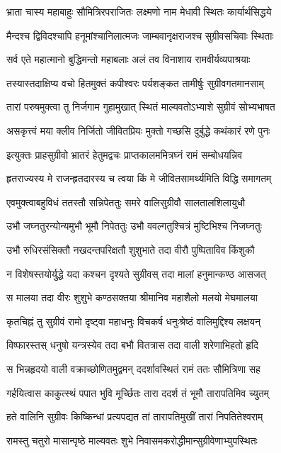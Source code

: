 \twolineshloka
{भ्राता चास्य महाबाहुः सौमित्रिरपराजितः}
{लक्ष्मणो नाम मेधावी स्थितः कार्यार्थसिद्धये}


\twolineshloka
{मैन्दश्च द्विविदश्चापि हनूमांश्चानिलात्मजः}
{जाम्बवानृक्षराजश्च सुग्रीवसचिवाः स्थिताः}


\twolineshloka
{सर्व एते महात्मानो बुद्धिमन्तो महाबलाः}
{अलं तव विनाशाय रामवीर्यव्यपाश्रयाः}


\twolineshloka
{तस्यास्तदाक्षिप्य वचो हितमुक्तं कपीश्वरः}
{पर्यशङ्कत तामीर्षुः सुग्रीवगतमानसाम्}


\twolineshloka
{तारां परुषमुक्त्वा तु निर्जगाम गुहामुखात्}
{स्थितं माल्यवतोऽभ्याशे सुग्रीवं सोभ्यभाषत}


\twolineshloka
{असकृत्त्वं मया क्लीव निर्जितो जीवितप्रियः}
{मुक्तो गच्छसि दुर्बुद्धे कथंकारं रणे पुनः}


\twolineshloka
{इत्युक्तः प्राहसुग्रीवो भ्रातरं हेतुमद्वचः}
{प्राप्तकालममित्रघ्नं रामं सम्बोधयन्निव}


\twolineshloka
{हृतराज्यस्य मे राजन्हृतदारस्य च त्वया}
{किं मे जीवितसामर्थ्यमिति विद्धि समागतम्}


\twolineshloka
{एवमुक्त्वाबहुविधं ततस्तौ सन्निपेततुः}
{समरे वालिसुग्रीवौ सालतालशिलायुधौ}


\twolineshloka
{उभौ जघ्नतुरन्योन्यमुभौ भूमौ निपेततुः}
{उभौ ववल्गतुश्चित्रं मुष्टिभिश्च निजघ्नतुः}


\twolineshloka
{उभौ रुधिरसंसिक्तौ नखदन्तपरिक्षतौ}
{शुशुभाते तदा वीरौ पुष्पिताविव किंशुकौ}


\twolineshloka
{न विशेषस्तयोर्युद्धे यदा कश्चन दृश्यते}
{सुग्रीवस् तदा मालां हनुमान्कण्ठ आसजत्}


\twolineshloka
{स मालया तदा वीरः शुशुभे कण्ठसक्तया}
{श्रीमानिव महाशैलो मलयो मेघमालया}


\twolineshloka
{कृतचिह्नं तु सुग्रीवं रामो दृष्ट्वा महाधनुः}
{विचकर्ष धनुःश्रेष्ठं वालिमुद्दिश्य लक्षयन्}


\twolineshloka
{विष्फारस्तस् धनुषो यन्त्रस्येव तदा बभौ}
{वितत्रास तदा वाली शरेणाभिहतो हृदि}


\twolineshloka
{स भिन्नहृदयो वाली वक्राच्छोणितमुद्वमन्}
{ददर्शावस्थितं रामं ततः सौमित्रिणा सह}


\twolineshloka
{गर्हयित्वास काकुत्स्थं पपात भुवि मूर्च्छितः}
{तारा ददर्श तं भूमौ तारापतिमिव च्युतम्}


\twolineshloka
{हते वालिनि सुग्रीवः किष्किन्धां प्रत्यपद्यत}
{तां तारापतिमुखीं तारां निपतितेश्वराम्}


\twolineshloka
{रामस्तु चतुरो मासान्पृष्ठे माल्यवतः शुभे}
{निवासमकरोद्धीमान्सुग्रीवेणाभ्युपस्थितः}


